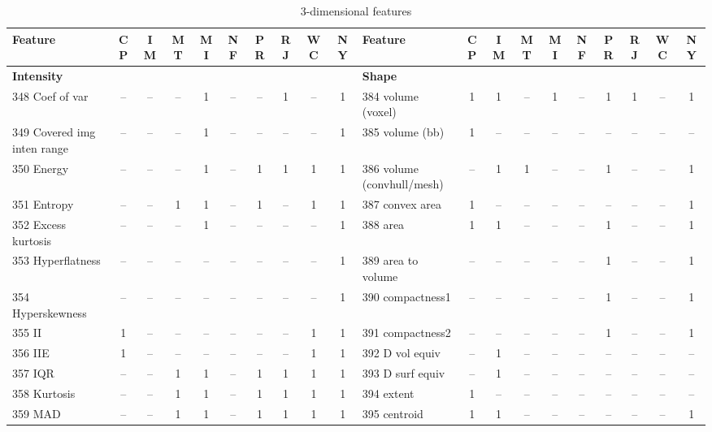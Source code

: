 \documentclass[sn-mathphys,Numbered]{sn-jnl}%
\theoremstyle{thmstyleone}%
\theoremstyle{thmstyletwo}%
\theoremstyle{thmstylethree}%
\begin{document}

\begin{table} [!hbt]
\centering
\caption {3-dimensional features}
\label {table:VOL}
\begin{tiny}
\begin{tabular} {
  l  c  c  c  c  c  c  c  c  c   l  c  c  c  c  c  c  c  c  c
}
\toprule

  Feature & CP &  IM &  MT &  MI & NF &  PR &  RJ & WC & NY &  Feature & CP &  IM &  MT &  MI & NF &  PR &  RJ & WC & NY \\
  \midrule
  \bf Intensity \rm &  &  &  &  &  &  &  &  &  &  \bf Shape \rm &  &  &  &  &  &  &  &  &  \\
 348 Coef of var & -- & -- & -- & 1 & -- & -- & 1 & -- & 1 & 384 volume (voxel) & 1 & 1 & -- & 1 & -- & 1 & 1 & -- & 1 \\
 349 Covered img inten range & -- & -- & -- & 1 & -- & -- & -- & -- & 1 & 385 volume (bb) & 1 & -- & -- & -- & -- & -- & -- & -- & -- \\
 350 Energy & -- & -- & -- & 1 & -- & 1 & 1 & 1 & 1 & 386 volume (convhull/mesh) & -- & 1 & 1 & -- & -- & 1 & -- & -- & 1 \\
 351 Entropy & -- & -- & 1 & 1 & -- & 1 & -- & 1 & 1 & 387 convex area & 1 & -- & -- & -- & -- & -- & -- & -- & 1 \\
 352 Excess kurtosis & -- & -- & -- & 1 & -- & -- & -- & -- & 1 & 388 area & 1 & 1 & -- & -- & -- & 1 & -- & -- & 1 \\
 353 Hyperflatness & -- & -- & -- & -- & -- & -- & -- & -- & 1 & 389 area to volume & -- & -- & -- & -- & -- & 1 & -- & -- & 1 \\
 354 Hyperskewness & -- & -- & -- & -- & -- & -- & -- & -- & 1 & 390 compactness1 & -- & -- & -- & -- & -- & 1 & -- & -- & 1 \\
 355 II & 1 & -- & -- & -- & -- & -- & -- & 1 & 1 & 391 compactness2 & -- & -- & -- & -- & -- & 1 & -- & -- & 1 \\
 356 IIE & 1 & -- & -- & -- & -- & -- & -- & 1 & 1 & 392 D vol equiv & -- & 1 & -- & -- & -- & -- & -- & -- & -- \\
 357 IQR & -- & -- & 1 & 1 & -- & 1 & 1 & 1 & 1 & 393 D surf equiv & -- & 1 & -- & -- & -- & -- & -- & -- & -- \\
 358 Kurtosis & -- & -- & 1 & 1 & -- & 1 & 1 & 1 & 1 & 394 extent & 1 & -- & -- & -- & -- & -- & -- & -- & -- \\
 359 MAD & -- & -- & 1 & 1 & -- & 1 & 1 & 1 & 1 & 395 centroid & 1 & 1 & -- & -- & -- & -- & -- & -- & 1 \\

\end{tabular}
\end{tiny}
\end{table}
\end{document}
